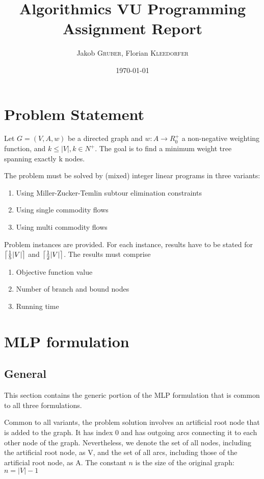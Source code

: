 \documentclass{article}
\title{Algorithmics VU Programming Assignment Report} %
\author{Jakob \textsc{Gruber}, Florian \textsc{Kleedorfer}} %
\date{\today} %
\DeclarePairedDelimiter{\ceil}{\lceil}{\rceil}
\begin{document}
\maketitle %

\section{Problem Statement}

Let $G=(V,A,w)$ be a directed graph and $w: A \rightarrow R_0^+$ a non-negative weighting function, and $k \leq |V|, k \in N^+$. The goal is to find a minimum weight tree spanning exactly k nodes.

The problem must be solved by (mixed) integer linear programs in three variants:
\begin{enumerate}
	\item Using Miller-Zucker-Temlin subtour elimination constraints
	\item Using single commodity flows
	\item Using multi commodity flows
\end{enumerate}
Problem instances are provided. For each instance, results have to be stated for $\ceil[\big]{\frac{1}{5}|V|}$ and  $\ceil[\big]{\frac{1}{2}|V|}$. The results must comprise 
\begin{enumerate}
\item Objective function value
\item Number of branch and bound nodes
\item Running time
\end{enumerate}

\section{MLP formulation} 
\subsection{General}
This section contains the generic portion of the MLP formulation that is common to all three formulations.

Common to all variants, the problem solution involves an artificial root node that is added to the graph. It has index 0 and has outgoing arcs connecting it to each other node of the graph. Nevertheless, we denote the set of all nodes, including the artificial root node, as V, and the set of all arcs, including those of the artificial root node, as A. The constant $n$ is the size of the original graph: $n = |V| - 1$
\end{document}
